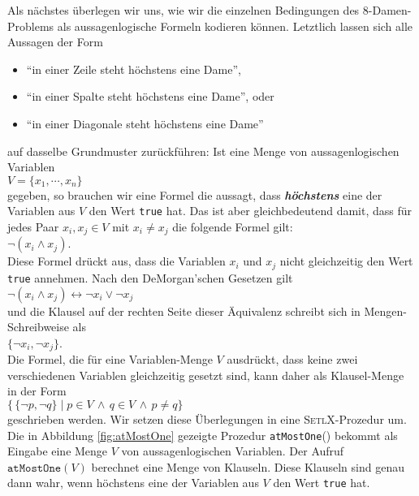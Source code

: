 Als n\"{a}chstes \"{u}berlegen wir uns, wie wir die einzelnen Bedingungen des 8-Damen-Problems 
als aussagenlogische
Formeln kodieren k\"{o}nnen.  Letztlich lassen sich alle Aussagen der Form
\begin{itemize}
\item ``in einer Zeile steht h\"{o}chstens eine Dame'', 
\item ``in einer Spalte steht h\"{o}chstens eine Dame'', oder 
\item ``in einer Diagonale steht h\"{o}chstens eine Dame'' 
\end{itemize}
auf dasselbe Grundmuster zur\"{u}ckf\"{u}hren:
Ist eine Menge von aussagenlogischen Variablen \\[0.2cm]
\hspace*{1.3cm} $V = \{ x_1, \cdots, x_n \}$ \\[0.2cm]
gegeben, so brauchen wir eine Formel die aussagt, dass \textbf{\emph{\color{blue}h\"{o}chstens}} eine der Variablen aus
$V$ den Wert \texttt{true} hat.  Das ist aber gleichbedeutend damit, dass f\"{u}r jedes Paar
$x_i, x_j \in V$ mit $x_i \not= x_j$ die folgende Formel gilt: \\[0.2cm]
\hspace*{1.3cm} $\neg (x_i \wedge x_j)$. \\[0.2cm]
Diese Formel dr\"{u}ckt aus, dass die Variablen $x_i$ und $x_j$ nicht gleichzeitig den Wert
\texttt{true} annehmen.  Nach den De\-Morgan'schen Gesetzen gilt
\\[0.2cm]
\hspace*{1.3cm}
$\neg (x_i \wedge x_j) \leftrightarrow \neg x_i \vee \neg x_j$
\\[0.2cm]
und die Klausel auf der rechten Seite dieser \"{A}quivalenz schreibt sich in Mengen-Schreibweise als
\\[0.2cm]
\hspace*{1.3cm}  $\{\neg x_i, \neg x_j \}$. \\[0.2cm]
Die Formel, die f\"{u}r eine Variablen-Menge $V$ ausdr\"{u}ckt, dass keine zwei verschiedenen
Variablen gleichzeitig gesetzt sind, kann daher als Klausel-Menge in der Form
\\[0.2cm]
\hspace*{1.3cm} $\bigl\{\, \{ \neg p, \neg q \} \;|\; p \in V \,\wedge\, q \in V
\,\wedge\, p \not= q \bigr\}$
\\[0.2cm]
geschrieben werden.
Wir setzen diese \"{U}berlegungen in eine \textsc{SetlX}-Prozedur um.  Die in Abbildung \ref{fig:atMostOne}
gezeigte Prozedur \texttt{atMostOne}() bekommt als Eingabe eine Menge $V$ von
aussagenlogischen Variablen.  Der Aufruf $\texttt{atMostOne}(V)$ berechnet eine Menge von
Klauseln.  Diese Klauseln sind genau dann wahr, wenn h\"{o}chstens eine der Variablen aus $V$
den Wert \texttt{true} hat.

